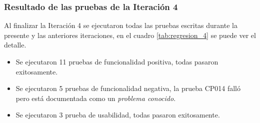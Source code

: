 \subsubsection{Resultado de las pruebas de la Iteración 4}

Al finalizar la Iteración 4 se ejecutaron todas las pruebas escritas durante la presente y las anteriores iteraciones, en el cuadro \ref{tab:regresion_4} se puede ver el detalle.





\begin{itemize}
  \item Se ejecutaron 11 pruebas de funcionalidad positiva, todas pasaron exitosamente.
  \item Se ejecutaron 5 pruebas de funcionalidad negativa, la prueba CP014 falló pero está documentada como un \emph{problema conocido}.
  \item Se ejecutaron 3 prueba de usabilidad, todas pasaron exitosamente.
\end{itemize}
